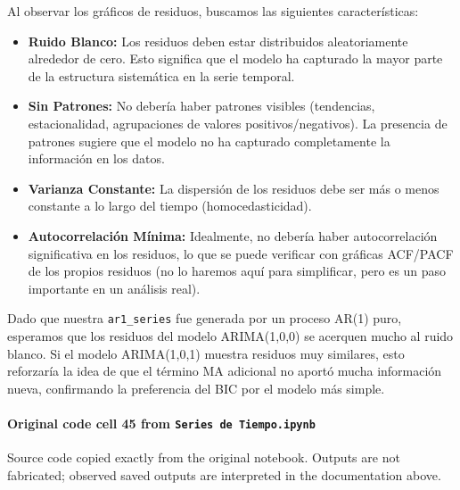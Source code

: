 \documentclass[
  11pt,
]{article}
\providecommand{\tightlist}{%
  \setlength{\itemsep}{0pt}\setlength{\parskip}{0pt}}
\begin{document}
Al observar los gráficos de residuos, buscamos las siguientes características:

\begin{itemize}
\tightlist
\item
  \textbf{Ruido Blanco:} Los residuos deben estar distribuidos aleatoriamente alrededor de cero. Esto significa que el modelo ha capturado la mayor parte de la estructura sistemática en la serie temporal.
\item
  \textbf{Sin Patrones:} No debería haber patrones visibles (tendencias, estacionalidad, agrupaciones de valores positivos/negativos). La presencia de patrones sugiere que el modelo no ha capturado completamente la información en los datos.
\item
  \textbf{Varianza Constante:} La dispersión de los residuos debe ser más o menos constante a lo largo del tiempo (homocedasticidad).
\item
  \textbf{Autocorrelación Mínima:} Idealmente, no debería haber autocorrelación significativa en los residuos, lo que se puede verificar con gráficas ACF/PACF de los propios residuos (no lo haremos aquí para simplificar, pero es un paso importante en un análisis real).
\end{itemize}

Dado que nuestra \texttt{ar1\_series} fue generada por un proceso AR(1) puro, esperamos que los residuos del modelo ARIMA(1,0,0) se acerquen mucho al ruido blanco. Si el modelo ARIMA(1,0,1) muestra residuos muy similares, esto reforzaría la idea de que el término MA adicional no aportó mucha información nueva, confirmando la preferencia del BIC por el modelo más simple.

\paragraph{\texorpdfstring{Original code cell 45 from \texttt{Series\ de\ Tiempo.ipynb}}{Original code cell 45 from Series de Tiempo.ipynb}}\label{original-code-cell-45-from-series-de-tiempoipynb}

Source code copied exactly from the original notebook. Outputs are not fabricated; observed saved outputs are interpreted in the documentation above.
\end{document}
